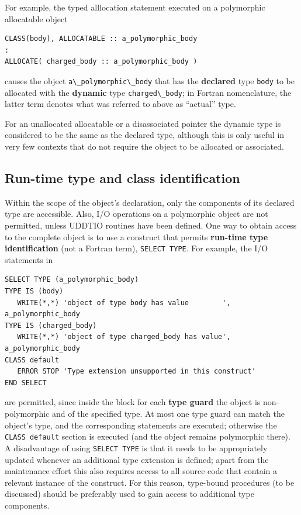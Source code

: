 \documentclass[
  paper=a4,
  ,captions=tableheading
]{scrartcl}
\newcommand{\passthrough}[1]{#1}
\begin{document}
For example, the typed alllocation statement executed on a polymorphic
allocatable object

\begin{lstlisting}
CLASS(body), ALLOCATABLE :: a_polymorphic_body
:
ALLOCATE( charged_body :: a_polymorphic_body )
\end{lstlisting}

causes the object \passthrough{\lstinline!a\_polymorphic\_body!} that
has the \textbf{declared} type \passthrough{\lstinline!body!} to be
allocated with the \textbf{dynamic} type
\passthrough{\lstinline!charged\_body!}; in Fortran nomenclature, the
latter term denotes what was referred to above as ``actual'' type.

For an unallocated allocatable or a disassociated pointer the dynamic
type is considered to be the same as the declared type, although this is
only useful in very few contexts that do not require the object to be
allocated or associated.

\subsection{Run-time type and class
identification}\label{run-time-type-and-class-identification}

Within the scope of the object's declaration, only the components of its
declared type are accessible. Also, I/O operations on a polymorphic
object are not permitted, unless UDDTIO routines have been defined. One
way to obtain access to the complete object is to use a construct that
permits \textbf{run-time type identification} (not a Fortran term),
\passthrough{\lstinline!SELECT TYPE!}. For example, the I/O statements
in

\begin{lstlisting}
SELECT TYPE (a_polymorphic_body)
TYPE IS (body)
   WRITE(*,*) 'object of type body has value        ', a_polymorphic_body
TYPE IS (charged_body)
   WRITE(*,*) 'object of type charged_body has value', a_polymorphic_body
CLASS default
   ERROR STOP 'Type extension unsupported in this construct'
END SELECT
\end{lstlisting}

are permitted, since inside the block for each \textbf{type guard} the
object is non-polymorphic and of the specified type. At most one type
guard can match the object's type, and the corresponding statements are
executed; otherwise the \passthrough{\lstinline!CLASS default!} section
is executed (and the object remains polymorphic there). A disadvantage
of using \passthrough{\lstinline!SELECT TYPE!} is that it needs to be
appropriately updated whenever an additional type extension is defined;
apart from the maintenance effort this also requires access to all
source code that contain a relevant instance of the construct. For this
reason, type-bound procedures (to be discussed) should be preferably
used to gain access to additional type components.
\end{document}
